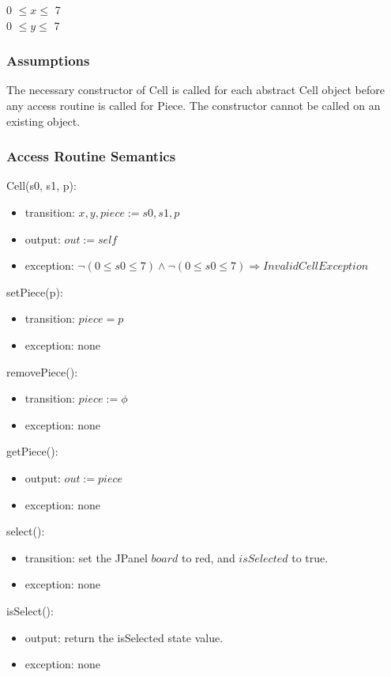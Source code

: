 \documentclass[12pt]{article}
\begin{document}
0 $\leq x \leq$ 7\\
0 $\leq y \leq$ 7 

\subsubsection* {Assumptions}
The necessary constructor of Cell is called for each abstract Cell object before any
access routine is called for Piece.  The constructor cannot be called on
an existing object.

\subsubsection* {Access Routine Semantics}

Cell(s0, s1, p):
\begin{itemize}
\item transition: $x,y,piece := s0,s1,p$
\item output: $out := \mathit{self}$
\item exception: $ \neg (0 \leq s0 \leq 7) \wedge  \neg (0 \leq s0 \leq 7) \Rightarrow InvalidCellException$
\end{itemize}

\noindent setPiece(p):
\begin{itemize}
\item transition: $piece = p$
\item exception: none
\end{itemize}

\noindent removePiece():
\begin{itemize}
\item transition: $piece := \phi$
\item exception: none
\end{itemize}

\noindent getPiece():
\begin{itemize}
\item output: $out := piece$
\item exception: none
\end{itemize}

\noindent select():
\begin{itemize}
\item transition: set the JPanel $board$ to red, and $isSelected$ to true.
\item exception: none
\end{itemize}

\noindent isSelect():
\begin{itemize}
\item output: return the isSelected state value. 
\item exception: none
\end{itemize}
\end{document}
